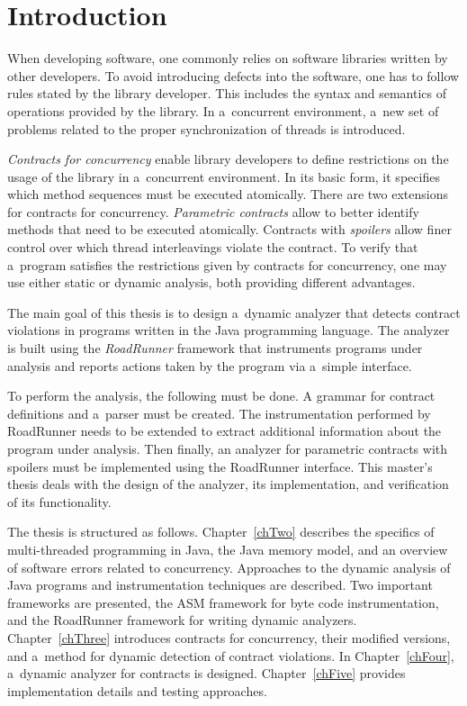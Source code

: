 
\chapter{Introduction}

When developing software, one commonly relies on software libraries written by
other developers. To avoid introducing defects into the software, one has to
follow rules stated by the library developer. This includes the syntax and
semantics of operations provided by the library. In a~concurrent environment,
a~new set of problems related to the proper synchronization of threads is
introduced.

\emph{Contracts for concurrency} enable library developers to define
restrictions on the usage of the library in a~concurrent environment. In its
basic form, it specifies which method sequences must be executed atomically.
There are two extensions for contracts for concurrency. \emph{Parametric
contracts} allow to better identify methods that need to be executed atomically.
Contracts with \emph{spoilers} allow finer control over which thread
interleavings violate the contract. To verify that a~program satisfies the
restrictions given by contracts for concurrency, one may use either static or
dynamic analysis, both providing different advantages.

The main goal of this thesis is to design a~dynamic analyzer that detects
contract violations in programs written in the Java programming language. The
analyzer is built using the \emph{RoadRunner} framework that instruments
programs under analysis and reports actions taken by the program via a~simple
interface.

To perform the analysis, the following must be done. A grammar for contract
definitions and a~parser must be created. The instrumentation performed by
RoadRunner needs to be extended to extract additional information about the
program under analysis. Then finally, an analyzer for parametric contracts with
spoilers must be implemented using the RoadRunner interface. This master's
thesis deals with the design of the analyzer, its implementation, and
verification of its functionality.

The thesis is structured as follows. Chapter~\ref{chTwo} describes the specifics
of multi-threaded programming in Java, the Java memory model, and an overview of
software errors related to concurrency. Approaches to the dynamic analysis of
Java programs and instrumentation techniques are described. Two important
frameworks are presented, the ASM framework for byte code instrumentation, and
the RoadRunner framework for writing dynamic analyzers. Chapter~\ref{chThree}
introduces contracts for concurrency, their modified versions, and a~method for
dynamic detection of contract violations. In Chapter~\ref{chFour}, a~dynamic
analyzer for contracts is designed. Chapter~\ref{chFive} provides implementation
details and testing approaches.



